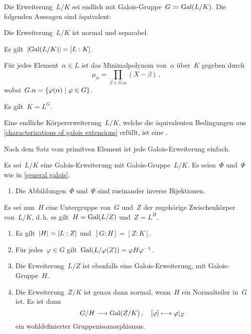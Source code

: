 \begin{proposition}
  \label{characterizations of galois extensions}
  Die Erweiterung~$L/K$ sei endlich mit Galois-Gruppe~$G \coloneqq \operatorname{Gal}(L/K)$.
  Die folgenden Aussagen sind äquivalent:
  \begin{equivlist}
    \item
      Die Erweiterung~$L/K$ ist normal und separabel.
    \item
      Es gilt~$\lvert \operatorname{Gal}(L/K) \rvert = [L : K]$.
    \item
      Für jedes Element~$\alpha \in L$ ist das Minimalpolynom von~$\alpha$ über~$K$ gegeben durch
      \[
        \mu_\alpha
        =
        \prod_{\beta \in G.\alpha}
        (X - \beta) \,,
      \]
      wobei~$G.\alpha = \{ \varphi(\alpha) \suchthat \varphi \in G \}$.
    \item
      Es gilt~$K = L^G$.
  \end{equivlist}
\end{proposition}

\begin{definition}
  Eine endliche Körpererweiterung~$L/K$, welche die äquivalenten Bedingungen aus \cref{characterizations of galois extensions} erfüllt, ist eine .
\end{definition}

\begin{remark}
  Nach dem Satz vom primitven Element ist jede Galois-Erweiterung einfach.
\end{remark}

\begin{theorem}
  Es sei~$L/K$ eine Galois-\hspace{0pt}Erweiterung mit Galois-Gruppe~$L/K$.
  Es seien~$\Phi$ und~$\Psi$ wie in \cref{general galois}.
  \begin{enumerate}
    \item
      Die Abbildungen~$\Phi$ und~$\Psi$ sind zueinander inverse Bijektionen.
  \end{enumerate}
  Es sei nun~$H$ eine Untergruppe von~$G$ und~$Z$ der zugehörige Zwischenkörper von~$L/K$, d.\,h. es gilt~$H = \operatorname{Gal}(L/Z)$ und~$Z = L^H$.
  \begin{enumerate}[resume*]
    \item
      Es gilt~$\lvert H\rvert = [L : Z]$ und~$[G : H] = [Z : K]$.
    \item
      Für jedes~$\varphi \in G$ gilt~$\operatorname{Gal}(L / \varphi(Z)) = \varphi H \varphi^{-1}$.
    \item
      Die Erweiterung~$L/Z$ ist ebenfalls eine Galois-Erweiterung, mit Galois-Gruppe~$H$.
    \item
      Die Erweiterung~$Z/K$ ist genau dann normal, wenn~$H$ ein Normalteiler in~$G$ ist.
      Es ist dann
      \[
        G / H
        \to
        \Gal(Z/K) \,,
        \quad
        \class{\varphi}
        \mapsto
        \restrict{\varphi}{Z}
      \]
      ein wohldefinierter Gruppenisomorphismus.
  \end{enumerate}
\end{theorem}





